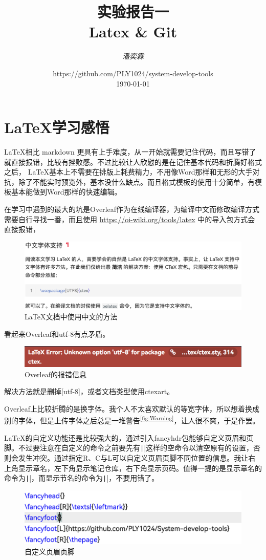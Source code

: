 \documentclass[fontset=ubuntu]{ctexart}
\title{\Huge \textbf{实验报告一\\ Latex{} \& Git}}
\author{\textit{潘奕霖}}
\date{https://github.com/PLY1024/system-develop-tools\\ \today}
\begin{document}
\maketitle
\newpage

\tableofcontents
\newpage

\section{ \LaTeX 学习感悟}
\LaTeX 相比 markdown 更具有上手难度，从一开始就需要记住代码，而且写错了就直接报错，比较有挫败感。不过比较让人欣慰的是在记住基本代码和折腾好格式之后， \LaTeX 基本上不需要在排版上耗费精力，不用像Word那样和无形的大手对抗，除了不能实时预览外，基本没什么缺点。而且格式模板的使用十分简单，有模板基本能做到Word那样的快速编辑。

在学习中遇到的最大的坑是Overleaf作为在线编译器，为编译中文而修改编译方式需要自行寻找一番，而且使用 \url{https://oi-wiki.org/tools/latex} 中的导入包方式会直接报错，
\begin{figure}[hbt]
    \centering
    \includegraphics[width=0.5\linewidth]{Chinese.png}
    \caption{ \LaTeX 文档中使用中文的方法}
    \label{fig:Chinese}
\end{figure}
看起来Overleaf和utf-8有点矛盾。
\begin{figure}[hbt]
    \centering
    \includegraphics[width=0.5\linewidth]{Error.png}
    \caption{Overleaf的报错信息}
    \label{fig:Error}
\end{figure}

解决方法就是删掉[utf-8]，或者文档类型使用ctexart。

Overleaf上比较折腾的是换字体。我个人不太喜欢默认的等宽字体，所以想着换成别的字体，但是上传字体之后总是一堆警告\textsuperscript{\ref{fig:Warning}}，让人很不爽，于是作罢。

\LaTeX 的自定义功能还是比较强大的，通过引入fancyhdr包能够自定义页眉和页脚。不过要注意在自定义的命令之前要先有\texttt|\fancyhead{}|这样的空命令以清空原有的设置，否则会发生冲突。通过指定R、C与L可以自定义页眉页脚不同位置的信息。我让右上角显示章名，左下角显示笔记仓库，右下角显示页码。值得一提的是显示章名的命令为\texttt|\leftmark|，而显示节名的命令为\texttt|\rightmark|，不要用错了。
\begin{figure}[htb]
    \centering
    \includegraphics[width=0.5\linewidth]{Custom.png}
    \caption{自定义页眉页脚}
    \label{fig:Custom}
\end{figure}
\end{document}
